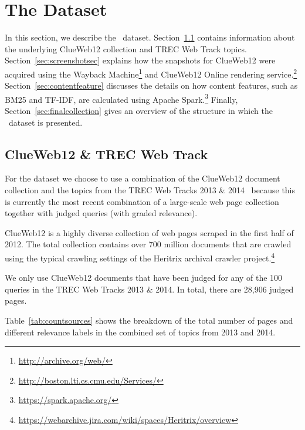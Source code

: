 
\section{The \protect\datasetname{} Data\-set}
In this section, we describe the \datasetname~data\-set. 
Section~\ref{sec:trecclue} contains information about the underlying ClueWeb12 collection and TREC Web Track topics. Section~\ref{sec:screenshotsec} explains how the snapshots for ClueWeb12 were acquired using the Wayback Machine\footnote{\url{http://archive.org/web/}} and ClueWeb12 Online rendering service.\footnote{\url{http://boston.lti.cs.cmu.edu/Services/}} Section~\ref{sec:contentfeature} discusses the details on how content features, such as BM25 and TF-IDF, are calculated using Apache Spark.\footnote{\url{https://spark.apache.org/}} Finally, Section~\ref{sec:finalcollection} gives an overview of the structure in which the \datasetname~dataset is presented.

\subsection{ClueWeb12 \& TREC Web Track}\label{sec:trecclue}
For the \datasetname{} dataset we choose to use a combination of the ClueWeb12 document collection and the topics from the TREC Web Tracks 2013 \& 2014~\cite{collins2013trec,collins2015trec}
because this is currently the most recent combination of a large-scale web page collection together with judged queries (with graded relevance). 

ClueWeb12 is a highly diverse collection of web pages scraped in the first half of 2012.
The total collection contains over 700 million documents that are crawled using the typical crawling settings of the Heritrix archival crawler project.\footnote{\url{https://webarchive.jira.com/wiki/spaces/Heritrix/overview}}

We only use ClueWeb12 documents that have been judged for any of the 100 queries in the TREC Web Tracks 2013 \& 2014. In total, there are 28,906 judged pages.

Table~\ref{tab:countsources} shows the breakdown of the total number of pages and different relevance labels in the combined set of topics from 2013 and 2014.

